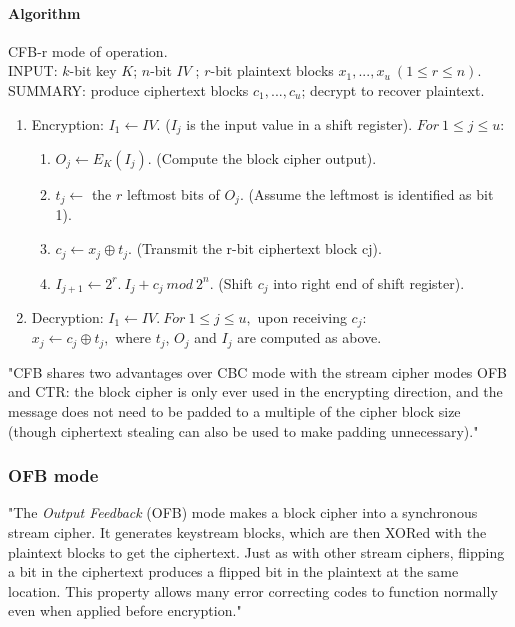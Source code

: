 \documentclass[a4paper,12pt,titlepage]{article}
\begin{document}
\paragraph{Algorithm}
CFB-r mode of operation. \citep{menezes_handbook_1996} \\
INPUT: $k$-bit key $K$; $n$-bit $IV$ ; $r$-bit plaintext blocks $x_1, ... , x_u\ (1 \le r \le n)$. \\
SUMMARY: produce ciphertext blocks $c_1, ... , c_u$; decrypt to recover plaintext.
\begin{enumerate}[noitemsep]
\item Encryption: $I_1 \leftarrow IV.$ ($I_j$ is the input value in a shift register). $For\ 1 \le j \le u:$
	\begin{enumerate}
	\item $O_j \leftarrow E_K(I_j).$ (Compute the block cipher output).
	\item $t_j \leftarrow$ the $r$ leftmost bits of $O_j$. (Assume the leftmost is identified as bit 1).
	\item $c_j \leftarrow x_j \oplus t_j.$ (Transmit the r-bit ciphertext block cj).
	\item $I_{j+1} \leftarrow 2^r.\ I_j + c_j\ mod\ 2^n.$ (Shift $c_j$ into right end of shift register).
	\end{enumerate}
\item Decryption: $I_1 \leftarrow IV.\ For\ 1 \le j \le u,$ upon receiving $c_j$:\\
$x_j \leftarrow c_j \oplus t_j,$ where $t_j$, $O_j$ and $I_j$ are computed as above.
\end{enumerate}

"CFB shares two advantages over CBC mode with the stream cipher modes OFB and CTR: the block cipher is only ever used in the encrypting direction, and the message does not need to be padded to a multiple of the cipher block size (though ciphertext stealing can also be used to make padding unnecessary)." \citep{wiki:mode-operation}

\subsubsection{OFB mode}

"The \textit{Output Feedback} (OFB) mode makes a block cipher into a synchronous stream cipher. It generates keystream blocks, which are then XORed with the plaintext blocks to get the ciphertext. Just as with other stream ciphers, flipping a bit in the ciphertext produces a flipped bit in the plaintext at the same location. This property allows many error correcting codes to function normally even when applied before encryption." \citep{wiki:mode-operation}
\end{document}
